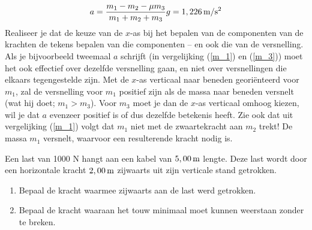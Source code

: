 \documentclass{ximera}
\begin{document}
\begin{exercise}
\begin{oplossing}
\begin{eqnarray*}
a=\frac{m_1-m_2-\mu m_3}{m_1+m_2+m_3}g=1,226\rm\,m/s^2
\end{eqnarray*}
\newline
\newline
Realiseer je dat de keuze van de $x$-as bij het bepalen van de componenten van de krachten de tekens bepalen van die componenten -- en ook die van de versnelling. Als je bijvoorbeeld tweemaal $a$ schrijft (in vergelijking (\ref{m_1}) en (\ref{m_3})) moet het ook effectief over dezelfde versnelling gaan, en niet over versnellingen die elkaars tegengestelde zijn. Met de $x$-as verticaal naar beneden geori\"enteerd voor $m_1$, zal de versnelling voor $m_1$ positief zijn als de massa naar beneden versnelt (wat hij doet; $m_1>m_3$). Voor $m_3$ moet je dan de $x$-as verticaal omhoog kiezen, wil je dat $a$ evenzeer positief is of dus dezelfde betekenis heeft.
\newline
\newline
Zie ook dat uit vergelijking (\ref{m_1}) volgt dat $m_1$ niet met de zwaartekracht aan $m_2$ trekt! De massa $m_1$ versnelt, waarvoor een resulterende kracht nodig is. 
\end{oplossing}



\end{exercise}

\begin{exercise} Een last van 1000 N hangt aan een kabel van $5,00\rm\,m$
lengte. Deze last wordt door een horizontale kracht $2,00\rm\,m$
zijwaarts uit zijn verticale stand getrokken.
\begin{enumerate}
    \item Bepaal de kracht waarmee zijwaarts aan de last werd
    getrokken.
    \item Bepaal de kracht waaraan het touw minimaal moet kunnen
    weerstaan zonder te breken.
\end{enumerate}


\end{exercise}
\end{document}
